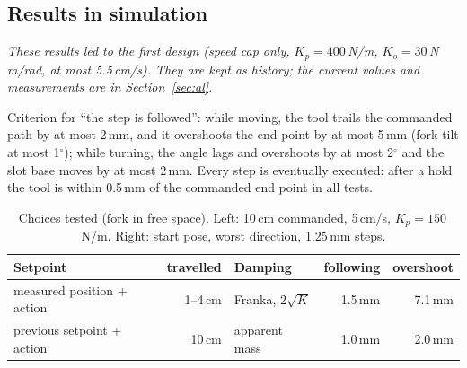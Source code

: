 \subsection{Results in simulation}
\label{sec:controller-results}

\emph{These results led to the first design (speed cap only, $K_p = 400$\,N/m, $K_o = 30$\,N\,m/rad, at most
5.5\,cm/s). They are kept as history; the current values and measurements are in Section~\ref{sec:al}.}

Criterion for ``the step is followed'': while moving, the tool trails the commanded path by at most 2\,mm, and it
overshoots the end point by at most 5\,mm (fork tilt at most 1$^\circ$); while turning, the angle lags and overshoots
by at most 2$^\circ$ and the slot base moves by at most 2\,mm. Every step is eventually executed: after a
hold the tool is within 0.5\,mm of the commanded end point in all tests.

\begin{table}[h]
  \centering
  \caption{Choices tested (fork in free space). Left: 10\,cm commanded, 5\,cm/s, $K_p = 150$\,N/m. Right: start
  pose, worst direction, 1.25\,mm steps.}
  \label{tab:controller-choices}
  \begin{tabular}{lr@{\qquad}lrr}
    \toprule
    Setpoint                      & travelled & Damping              & following & overshoot \\
    \midrule
    measured position + action  & 1--4\,cm  & Franka, $2\sqrt{K}$   & 1.5\,mm   & 7.1\,mm \\
    previous setpoint + action    & 10\,cm    & apparent mass         & 1.0\,mm   & 2.0\,mm \\
    \bottomrule
  \end{tabular}
\end{table}

